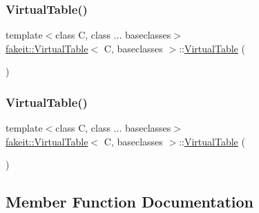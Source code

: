 \subsubsection{\texorpdfstring{VirtualTable()}{VirtualTable()}\hspace{0.1cm}{\footnotesize\ttfamily [9/10]}}
{\footnotesize\ttfamily template$<$class C, class ... baseclasses$>$ \\
\mbox{\hyperlink{structfakeit_1_1VirtualTable}{fakeit\+::\+Virtual\+Table}}$<$ C, baseclasses $>$\+::\mbox{\hyperlink{structfakeit_1_1VirtualTable}{Virtual\+Table}} (\begin{DoxyParamCaption}{ }\end{DoxyParamCaption})\hspace{0.3cm}{\ttfamily [inline]}}

\mbox{\label{structfakeit_1_1VirtualTable_ae64da18818c25b107d8f9f2c615c4c37}} 
\subsubsection{\texorpdfstring{VirtualTable()}{VirtualTable()}\hspace{0.1cm}{\footnotesize\ttfamily [10/10]}}
{\footnotesize\ttfamily template$<$class C, class ... baseclasses$>$ \\
\mbox{\hyperlink{structfakeit_1_1VirtualTable}{fakeit\+::\+Virtual\+Table}}$<$ C, baseclasses $>$\+::\mbox{\hyperlink{structfakeit_1_1VirtualTable}{Virtual\+Table}} (\begin{DoxyParamCaption}{ }\end{DoxyParamCaption})\hspace{0.3cm}{\ttfamily [inline]}}



\subsection{Member Function Documentation}
\mbox{\label{structfakeit_1_1VirtualTable_a79d7c3b29e6da1ba1974c8c9d69fd7bd}} 
